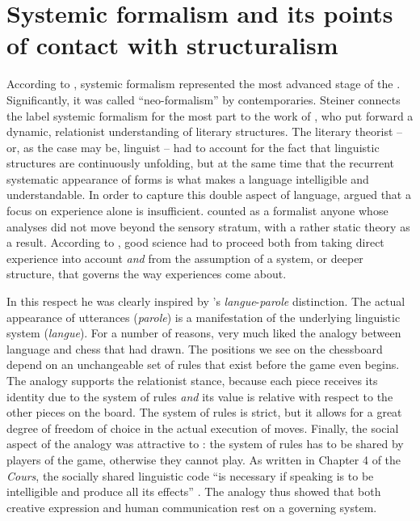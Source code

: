 \documentclass[output=paper]{langscibook}
\begin{document}
\section{Systemic formalism and its points of contact with structuralism}
\label{sec:karstens:systemicformalism}

According to \citet[112]{Steiner1984}, systemic formalism represented the most advanced stage of the . Significantly, it was called ``neo-for\-mal\-ism'' by contemporaries. Steiner connects the label systemic formalism for the most part to the work of {\Tynjanov}, who put forward a dynamic, relationist understanding of literary structures. The literary theorist -- or, as the case may be, linguist -- had to account for the fact that linguistic structures are continuously unfolding, but at the same time that the recurrent systematic appearance of forms is what makes a language intelligible and understandable. In order to capture this double aspect of language, {\Tynjanov} argued that a focus on experience alone is insufficient. {\Shklovsky} counted as a formalist anyone whose analyses did not move beyond the sensory stratum, with a rather static theory as a result. According to {\Tynjanov}, good science had to proceed both from taking direct experience into account \emph{and} from the assumption of a system, or deeper structure, that governs the way experiences come about. 

\largerpage[-1]In this respect he was clearly inspired by {\Saussure}'s \emph{langue}-\emph{parole} distinction. The actual appearance of utterances (\emph{parole}) is a manifestation of the underlying linguistic system (\emph{langue}). For a number of reasons, {\Tynjanov} very much liked the analogy between language and chess that {\Saussure} had drawn. The positions we see on the chessboard depend on an unchangeable set of rules that exist before the game even begins. The analogy supports the relationist stance, because each piece receives its identity due to the system of rules \emph{and} its value is relative with respect to the other pieces on the board. The system of rules is strict, but it allows for a great degree of freedom of choice in the actual execution of moves. Finally, the social aspect of the analogy was attractive to {\Tynjanov}: the system of rules has to be shared by players of the game, otherwise they cannot play. As written in Chapter 4 of the \emph{Cours}, the socially shared linguistic code ``is necessary if speaking is to be intelligible and produce all its effects'' \citep[37]{Saussure19221916}. The analogy thus showed that both creative expression and human communication rest on a governing system.
\end{document}

